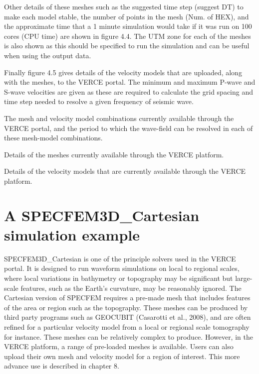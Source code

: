 \documentclass[english]{book}
\begin{document}
Other details of these meshes such as the suggested time step (suggest
DT) to make each model stable, the number of points in the mesh (Num. of
HEX), and the approximate time that a 1 minute simulation would take if
it was run on 100 cores (CPU time) are shown in figure 4.4. The UTM zone
for each of the meshes is also shown as this should be specified to run
the simulation and can be useful when using the output data.

Finally figure 4.5 gives details of the velocity models that are
uploaded, along with the meshes, to the VERCE portal. The minimum and
maximum P-wave and S-wave velocities are given as these are required to
calculate the grid spacing and time step needed to resolve a given
frequency of seismic wave.


 The mesh and velocity model combinations currently
available through the VERCE portal, and the period to which the
wave-field can be resolved in each of these mesh-model combinations.


 Details of the meshes currently available through the
VERCE platform.


 Details of the velocity models that are currently
available through the VERCE platform.


\chapter{A SPECFEM3D\_Cartesian simulation example}
\label{\detokenize{Section5::doc}}\label{\detokenize{Section5:a-specfem3d-cartesian-simulation-example}}
SPECFEM3D\_Cartesian is one of the principle solvers used in the VERCE
portal. It is designed to run waveform simulations on local to regional
scales, where local variations in bathymetry or topography may be
significant but large-scale features, such as the Earth’s curvature, may
be reasonably ignored. The Cartesian version of SPECFEM requires a
pre-made mesh that includes features of the area or region such as the
topography. These meshes can be produced by third party programs such as
GEOCUBIT (Casarotti et al., 2008), and are often refined for a
particular velocity model from a local or regional scale tomography for
instance. These meshes can be relatively complex to produce. However, in
the VERCE platform, a range of pre-loaded meshes is available. Users can
also upload their own mesh and velocity model for a region of interest.
This more advance use is described in chapter 8.
\end{document}
